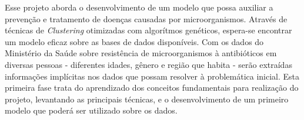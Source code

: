 Esse projeto aborda o desenvolvimento de um modelo que possa auxiliar a prevenção e tratamento de doenças causadas por microorganismos. Através de técnicas de {\it Clustering} otimizadas com algorítmos genéticos, espera-se encontrar um modelo eficaz sobre as bases de dados disponíveis. Com os dados do Ministério da Saúde sobre resistência de microorganismos à antibióticos em diversas pessoas - diferentes idades, gênero e região que habita - serão extraídas informações implícitas nos dados que possam resolver à problemática inicial. Esta primeira fase trata do aprendizado dos conceitos fundamentais para realização do projeto, levantando as principais técnicas, e o desenvolvimento de um primeiro modelo que poderá ser utilizado sobre os dados. 